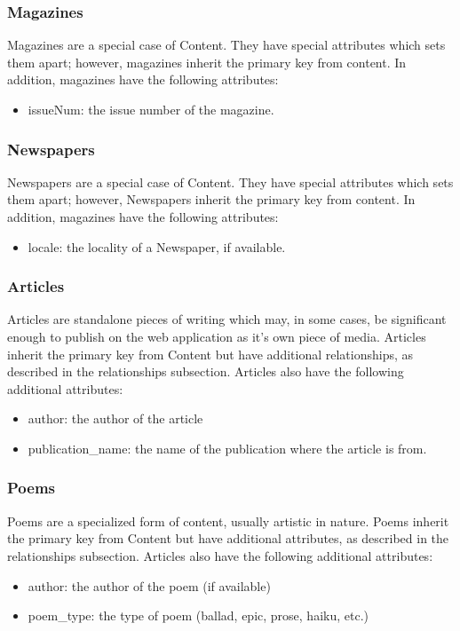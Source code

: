 \documentclass[letter, 12pt, titlepage]{article}
\begin{document}
\subsubsection{Magazines}
Magazines are a special case of Content. They have special attributes which sets them apart; however, magazines inherit the primary key from content. In addition, magazines have the following attributes:
\begin{itemize}
	\item issueNum: the issue number of the magazine.
\end{itemize}
\subsubsection{Newspapers}
Newspapers are a special case of Content. They have special attributes which sets them apart; however, Newspapers inherit the primary key from content. In addition, magazines have the following attributes:
\begin{itemize}
	\item locale: the locality of a Newspaper, if available.
\end{itemize}
\subsubsection{Articles}
Articles are standalone pieces of writing which may, in some cases, be significant enough to publish on the web application as it's own piece of media. Articles inherit the primary key from Content but have additional relationships, as described in the relationships subsection. Articles also have the following additional attributes:
\begin{itemize}
	\item author: the author of the article
	\item publication\_name: the name of the publication where the article is from.
\end{itemize}
\subsubsection{Poems}
Poems are a specialized form of content, usually artistic in nature. Poems inherit the primary key from Content but have additional attributes, as described in the relationships subsection. Articles also have the following additional attributes:
\begin{itemize}
	\item author: the author of the poem (if available)
	\item poem\_type: the type of poem (ballad, epic, prose, haiku, etc.)
\end{itemize}
\end{document}
